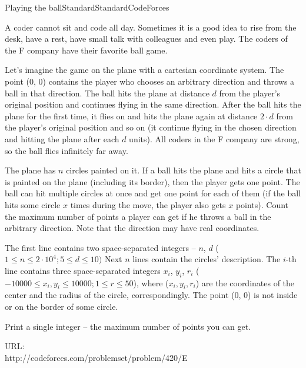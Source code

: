 \begin{problema}{Playing the ball}{Standard}{Standard}{CodeForces}


A coder cannot sit and code all day. Sometimes it is a good idea to rise from the desk, have a rest, have small talk with colleagues and even play. The coders of the F company have their favorite ball game.

Let's imagine the game on the plane with a cartesian coordinate system. The point (0, 0) contains the player who chooses an arbitrary direction and throws a ball in that direction. The ball hits the plane at distance $d$ from the player's original position and continues flying in the same direction. After the ball hits the plane for the first time, it flies on and hits the plane again at distance $2\cdot d$ from the player's original position and so on (it continue flying in the chosen direction and hitting the plane after each $d$ units). All coders in the F company are strong, so the ball flies infinitely far away.

The plane has $n$ circles painted on it. If a ball hits the plane and hits a circle that is painted on the plane (including its border), then the player gets one point. The ball can hit multiple circles at once and get one point for each of them (if the ball hits some circle $x$ times during the move, the player also gets $x$ points). Count the maximum number of points a player can get if he throws a ball in the arbitrary direction. Note that the direction may have real coordinates. \\


\InputFile

The first line contains two space-separated integers -- $n$, $d$ ($1 \leq n \leq 2 \cdot 10^4; 5 \leq d \leq 10)$ Next $n$ lines contain the circles' description. The $i$-th line contains three space-separated integers $x_i$, $y_i$, $r_i$ ($-10000 \leq x_i, y_i \leq 10000; 1 \leq r \leq 50$), where ($x_i, y_i, r_i$) are the coordinates of the center and the radius of the circle, correspondingly. The point (0, 0) is not inside or on the border of some circle.


\OutputFile

Print a single integer -- the maximum number of points you can get. \\



\Example



URL:\\ 
http://codeforces.com/problemset/problem/420/E


\end{problema}
